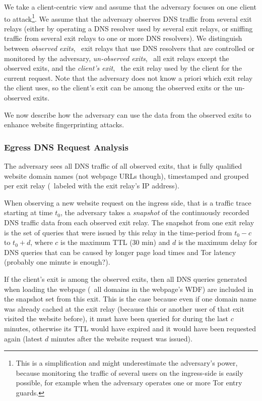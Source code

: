 We take a client-centric view and assume that the adversary focuses on
one client to attack\footnote{This is a simplification and might underestimate
the adversary's power, because monitoring the traffic of several users
on the ingress-side is easily possible, for example when the adversary
operates one or more Tor entry guards.}.
%
We assume that the adversary observes DNS traffic from several exit
relays (either by operating a DNS resolver used by several exit relays,
or sniffing traffic from several exit relays to one or more DNS
resolvers).
%
We distinguish between \emph{observed exits}, \ie~exit relays that use
DNS resolvers that are controlled or monitored by the adversary,
\emph{un-observed exits}, \ie~all exit relays except the observed
exits, and the \emph{client's exit}, \ie~the exit relay used by the
client for the current request.
%
Note that the adversary does not know a priori which exit relay the
client uses, so the client's exit can be among the observed exits or the
un-observed exits.

%
We now describe how the adversary can use the data from the observed
exits to enhance website fingerprinting attacks.


\subsubsection{Egress DNS Request Analysis}

The adversary sees all DNS traffic of all observed exits, that is fully
qualified website domain names (not webpage URLs though), timestamped
and grouped per exit relay (\eg~labeled with the exit relay's IP
address).

When observing a new website request on the ingress side, that is a
traffic trace starting at time $t_0$, the adversary takes a \emph{snapshot}
of the continuously recorded DNS traffic data from each observed exit relay.
The snapshot from one exit relay is the set of queries that were issued
by this relay in the time-period from $t_0 - c$ to $t_0 + d$,
where $c$ is the maximum TTL (30 min) and $d$ is the maximum delay
for DNS queries that can be caused by longer page load times and Tor
latency (probably one minute is enough?).

If the client's exit is among the observed exits, then
all DNS queries generated when loading the webpage (\ie~all domains in
the webpage's WDF) are included in the snapshot set from this exit. This is the case
because even if one domain name was already cached at the exit relay
(because this or another user of that exit visited the website before),
it must have been queried for during the last $c$ minutes, otherwise its
TTL would have expired and it would have been requested again (latest
$d$ minutes after the website request was issued).

